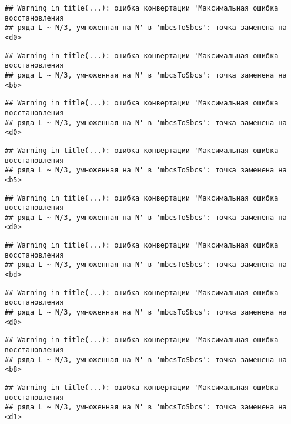 \documentclass[
]{article}
\begin{document}
\begin{verbatim}
## Warning in title(...): ошибка конвертации 'Максимальная ошибка восстановления
## ряда L ~ N/3, умноженная на N' в 'mbcsToSbcs': точка заменена на <d0>
\end{verbatim}

\begin{verbatim}
## Warning in title(...): ошибка конвертации 'Максимальная ошибка восстановления
## ряда L ~ N/3, умноженная на N' в 'mbcsToSbcs': точка заменена на <bb>
\end{verbatim}

\begin{verbatim}
## Warning in title(...): ошибка конвертации 'Максимальная ошибка восстановления
## ряда L ~ N/3, умноженная на N' в 'mbcsToSbcs': точка заменена на <d0>
\end{verbatim}

\begin{verbatim}
## Warning in title(...): ошибка конвертации 'Максимальная ошибка восстановления
## ряда L ~ N/3, умноженная на N' в 'mbcsToSbcs': точка заменена на <b5>
\end{verbatim}

\begin{verbatim}
## Warning in title(...): ошибка конвертации 'Максимальная ошибка восстановления
## ряда L ~ N/3, умноженная на N' в 'mbcsToSbcs': точка заменена на <d0>
\end{verbatim}

\begin{verbatim}
## Warning in title(...): ошибка конвертации 'Максимальная ошибка восстановления
## ряда L ~ N/3, умноженная на N' в 'mbcsToSbcs': точка заменена на <bd>
\end{verbatim}

\begin{verbatim}
## Warning in title(...): ошибка конвертации 'Максимальная ошибка восстановления
## ряда L ~ N/3, умноженная на N' в 'mbcsToSbcs': точка заменена на <d0>
\end{verbatim}

\begin{verbatim}
## Warning in title(...): ошибка конвертации 'Максимальная ошибка восстановления
## ряда L ~ N/3, умноженная на N' в 'mbcsToSbcs': точка заменена на <b8>
\end{verbatim}

\begin{verbatim}
## Warning in title(...): ошибка конвертации 'Максимальная ошибка восстановления
## ряда L ~ N/3, умноженная на N' в 'mbcsToSbcs': точка заменена на <d1>
\end{verbatim}
\end{document}
